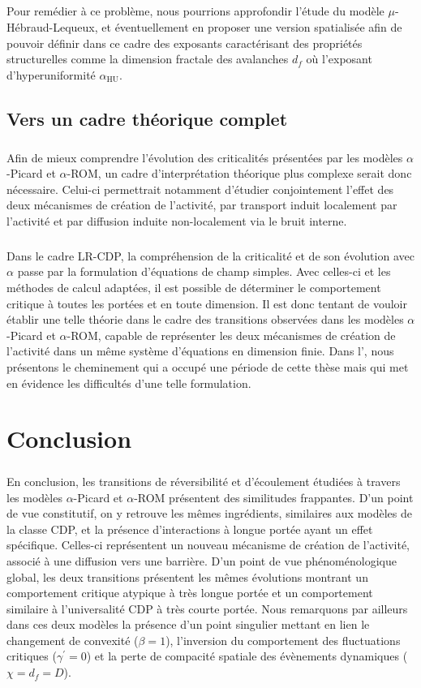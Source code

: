 \subparagraph{}Pour remédier à ce problème, nous pourrions approfondir l'étude du modèle $\mu$-Hébraud-Lequeux, et éventuellement en proposer une version spatialisée afin de pouvoir définir dans ce cadre des exposants caractérisant des propriétés structurelles comme la dimension fractale des avalanches $d_f$ où l'exposant d'hyperuniformité $\alpha_\text{HU}$.

\subsection{Vers un cadre théorique complet}

\subparagraph{}Afin de mieux comprendre l'évolution des criticalités présentées par les modèles $\alpha$-Picard et $\alpha$-ROM, un cadre d'interprétation théorique plus complexe serait donc nécessaire. Celui-ci permettrait notamment d'étudier conjointement l'effet des deux mécanismes de création de l'activité, par transport induit localement par l'activité et par diffusion induite non-localement via le bruit interne. 

\subparagraph{}Dans le cadre LR-CDP, la compréhension de la criticalité et de son évolution avec $\alpha$ passe par la formulation d'équations de champ simples. Avec celles-ci et les méthodes de calcul adaptées, il est possible de déterminer le comportement critique à toutes les portées et en toute dimension. Il est donc tentant de vouloir établir une telle théorie dans le cadre des transitions observées dans les modèles $\alpha$-Picard et $\alpha$-ROM, capable de représenter les deux mécanismes de création de l'activité dans un même système d'équations en dimension finie. Dans l', nous présentons le cheminement qui a occupé une période de cette thèse mais qui met en évidence les difficultés d'une telle formulation.

\section{Conclusion}

\subparagraph{}En conclusion, les transitions de réversibilité et d'écoulement étudiées à travers les modèles $\alpha$-Picard et $\alpha$-ROM présentent des similitudes frappantes. D'un point de vue constitutif, on y retrouve les mêmes ingrédients, similaires aux modèles de la classe CDP, et la présence d'interactions à longue portée ayant un effet spécifique. Celles-ci représentent un nouveau mécanisme de création de l'activité, associé à une diffusion vers une barrière. D'un point de vue phénoménologique global, les deux transitions présentent les mêmes évolutions montrant un comportement critique atypique à très longue portée et un comportement similaire à l'universalité CDP à très courte portée. Nous remarquons par ailleurs dans ces deux modèles la présence d'un point singulier mettant en lien le changement de convexité ($\beta = 1$), l'inversion du comportement des fluctuations critiques ($\gamma^\prime = 0$) et la perte de compacité spatiale des évènements dynamiques ($\chi = d_f = D$).


